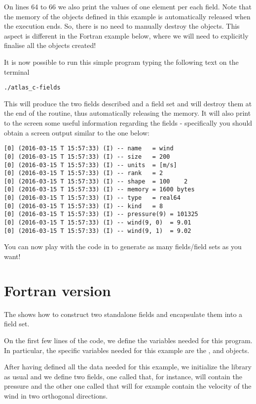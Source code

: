 On lines 64 to 66 we also print the values of one element 
per each field. Note that the memory of the objects defined 
in this example is automatically released when the execution 
ends. So, there is no need to manually destroy the objects.
This aspect is different in the Fortran example below, where 
we will need to explicitly finalise all the objects created!

It is now possible to run this simple program typing
the following text on the terminal
%
\begin{lstlisting}[style=BashStyle]
./atlas_c-fields
\end{lstlisting}
% 
This will produce the two fields described and a field 
set and will destroy them at the end of the routine, 
thus automatically releasing the memory. 
It will also print to the screen some useful information 
regarding the fields - specifically you should obtain 
a screen output similar to the one below:
%
\begin{lstlisting}[style=BashStyle]
[0] (2016-03-15 T 15:57:33) (I) -- name   = wind
[0] (2016-03-15 T 15:57:33) (I) -- size   = 200
[0] (2016-03-15 T 15:57:33) (I) -- units  = [m/s]
[0] (2016-03-15 T 15:57:33) (I) -- rank   = 2
[0] (2016-03-15 T 15:57:33) (I) -- shape  = 100    2
[0] (2016-03-15 T 15:57:33) (I) -- memory = 1600 bytes
[0] (2016-03-15 T 15:57:33) (I) -- type   = real64
[0] (2016-03-15 T 15:57:33) (I) -- kind   = 8
[0] (2016-03-15 T 15:57:33) (I) -- pressure(9) = 101325
[0] (2016-03-15 T 15:57:33) (I) -- wind(9, 0)  = 9.01
[0] (2016-03-15 T 15:57:33) (I) -- wind(9, 1)  = 9.02
\end{lstlisting}
% 
You can now play with the code in  
to generate as many fields/field sets as you want! 



\section{Fortran version}
The  shows how to construct two standalone 
fields and encapsulate them into a field set. 
%

%
On the first few lines of the code, we define the variables
needed for this program. In particular, the \Atlas specific 
variables needed for this example are the , 
 and  objects.

After having defined all the data needed for this example, 
we initialize the \Atlas library as usual and we define 
two fields, one called  that, for 
instance, will contain the pressure and the other one 
called  that will for example contain 
the velocity of the wind in two orthogonal directions.

